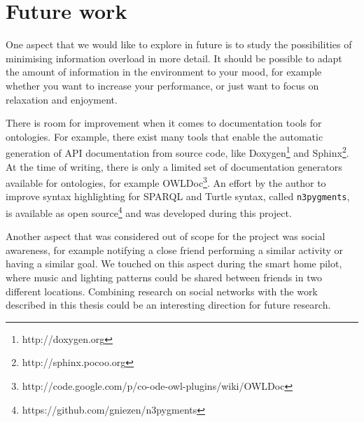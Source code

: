 \section{Future work}

One aspect that we would like to explore in future is to study the possibilities of minimising information overload in more detail. It should be possible to adapt the amount of information in the environment to your mood, for example whether you want to increase your performance, or just want to focus on relaxation and enjoyment.


There is room for improvement when it comes to documentation tools for ontologies. For example, there exist many tools that enable the automatic generation of \ac{API} documentation from source code, like Doxygen\footnote{http://doxygen.org} and Sphinx\footnote{http://sphinx.pocoo.org}. At the time of writing, there is only a limited set of documentation generators available for ontologies, for example OWLDoc\footnote{http://code.google.com/p/co-ode-owl-plugins/wiki/OWLDoc}. An effort by the author to improve syntax highlighting for \ac{SPARQL} and Turtle syntax, called \texttt{n3pygments}, is available as open source\footnote{https://github.com/gniezen/n3pygments} and was developed during this project.


Another aspect that was considered out of scope for the project was social awareness, for example notifying a close friend performing a similar activity or having a similar goal. We touched on this aspect during the smart home pilot, where music and lighting patterns could be shared between friends in two different locations. Combining research on social networks with the work described in this thesis could be an interesting direction for future research.

